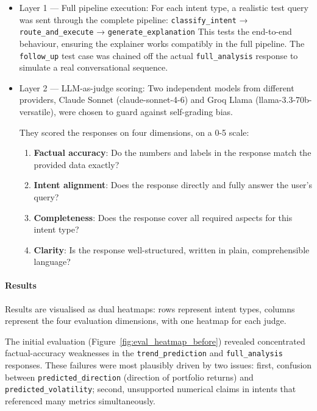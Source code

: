 \begin{itemize}
    \item Layer 1 — Full pipeline execution: \newline
    For each intent type, a realistic test query was sent through the complete pipeline: \texttt{classify\_intent} → \texttt{route\_and\_execute} → \texttt{generate\_explanation} \newline
    This tests the end-to-end behaviour, ensuring the explainer works compatibly in the full pipeline. The \texttt{follow\_up} test case was chained off the actual \texttt{full\_analysis} response to simulate a real conversational sequence.

    \item Layer 2 — LLM-as-judge scoring: \newline
    Two independent models from different providers, Claude Sonnet (claude-sonnet-4-6) and Groq Llama (llama-3.3-70b-versatile), were chosen to guard against self-grading bias. \newline

    They scored the responses on four dimensions, on a 0-5 scale:
    \begin{enumerate}
        \item \textbf{Factual accuracy}: Do the numbers and labels in the response match the provided data exactly?
        \item \textbf{Intent alignment}: Does the response directly and fully answer the user’s query?
        \item \textbf{Completeness}: Does the response cover all required aspects for this intent type?
        \item \textbf{Clarity}: Is the response well-structured, written in plain, comprehensible language?

    \end{enumerate}

\end{itemize}

\paragraph{Results}

Results are visualised as dual heatmaps: rows represent intent types, columns represent the four evaluation dimensions, with one heatmap for each judge.

The initial evaluation (Figure~\ref{fig:eval_heatmap_before}) revealed concentrated factual-accuracy weaknesses in the \texttt{trend\_prediction} and \texttt{full\_analysis} responses. These failures were most plausibly driven by two issues: first, confusion between \texttt{predicted\_direction} (direction of portfolio returns) and \texttt{predicted\_volatility}; second, unsupported numerical claims in intents that referenced many metrics simultaneously.

